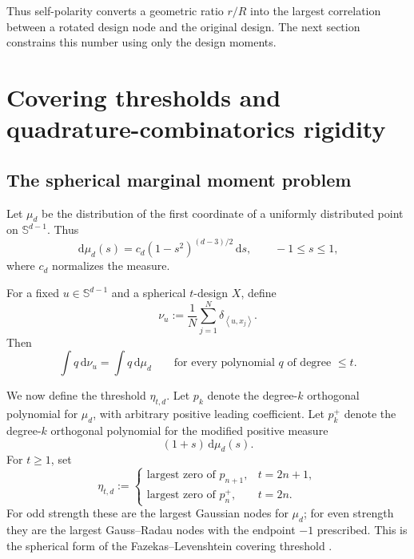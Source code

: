 \documentclass[11pt]{amsart}
\theoremstyle{definition}
\theoremstyle{remark}
\newcommand{\Sph}{\mathbb S}
\newcommand{\dd}{\,\mathrm d}
\newcommand{\ip}[2]{\left\langle #1,#2\right\rangle}
\begin{document}
Thus self-polarity converts a geometric ratio $r/R$ into the largest correlation between a rotated design node and the original design.  The next section constrains this number using only the design moments.

\section{Covering thresholds and quadrature-combinatorics rigidity}
\label{sec:quadrature}

\subsection{The spherical marginal moment problem}

Let $\mu_d$ be the distribution of the first coordinate of a uniformly distributed point on $\Sph^{d-1}$.  Thus
\begin{equation}\label{eq:marginal}
 \dd\mu_d(s)=c_d(1-s^2)^{(d-3)/2}\dd s,
 \qquad -1\le s\le1,
\end{equation}
where $c_d$ normalizes the measure.

For a fixed $u\in\Sph^{d-1}$ and a spherical $t$-design $X$, define
\[
 \nu_u:=\frac1N\sum_{j=1}^N\delta_{\ip{u}{x_j}}.
\]
Then
\begin{equation}\label{eq:momentmatch1d}
 \int q\dd\nu_u=\int q\dd\mu_d
 \qquad\text{for every polynomial }q\text{ of degree }\le t.
\end{equation}

We now define the threshold $\eta_{t,d}$.  Let $p_k$ denote the degree-$k$ orthogonal polynomial for $\mu_d$, with arbitrary positive leading coefficient.  Let $p_k^+$ denote the degree-$k$ orthogonal polynomial for the modified positive measure
\[
 (1+s)\dd\mu_d(s).
\]
For $t\ge1$, set
\begin{equation}\label{eq:eta}
 \eta_{t,d}:=
 \begin{cases}
 \text{largest zero of }p_{n+1},&t=2n+1,\\
 \text{largest zero of }p_n^+,&t=2n.
 \end{cases}
\end{equation}
For odd strength these are the largest Gaussian nodes for $\mu_d$; for even strength they are the largest Gauss--Radau nodes with the endpoint $-1$ prescribed.  This is the spherical form of the Fazekas--Levenshtein covering threshold \cite{FazekasLevenshtein1995}.
\end{document}
